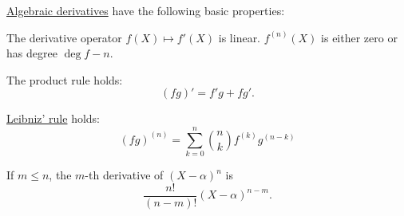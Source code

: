 \begin{proposition}\label{thm:def:algebraic_derivative}
  \hyperref[def:algebraic_derivative]{Algebraic derivatives} have the following basic properties:
  \begin{thmenum}
     The derivative operator \( f(X) \mapsto f'(X) \) is linear.
     \( f^{(n)}(X) \) is either zero or has degree \( \deg f - n \).

     The product rule holds:
    \begin{equation}\label{eq:thm:def:algebraic_derivative/product}
      (fg)' = f'g + fg'.
    \end{equation}

     \hyperref[thm:leibniz_rule]{Leibniz' rule} holds:
    \begin{equation}\label{eq:thm:def:algebraic_derivative/leibniz}
      (fg)^{(n)} = \sum_{k=0}^n \binom n k f^{(k)} g^{(n-k)}
    \end{equation}

     If \( m \leq n \), the \( m \)-th derivative of \( (X - \alpha)^n \) is
    \begin{equation*}
      \frac {n!} {(n-m)!} (X - \alpha)^{n-m}.
    \end{equation*}
  \end{thmenum}
\end{proposition}
